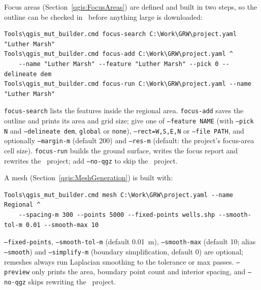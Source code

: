         Focus areas (Section~\ref{qgis:FocusAreas}) are defined and built in two steps, so the outline can be checked in \qgis\ before anything large is downloaded:
\begin{verbatim}
Tools\qgis_mut_builder.cmd focus-search C:\Work\GRW\project.yaml "Luther Marsh"
Tools\qgis_mut_builder.cmd focus-add C:\Work\GRW\project.yaml ^
    --name "Luther Marsh" --feature "Luther Marsh" --pick 0 --delineate dem
Tools\qgis_mut_builder.cmd focus-run C:\Work\GRW\project.yaml --name "Luther Marsh"
\end{verbatim}
        {\tt focus-search} lists the features inside the regional area.  {\tt focus-add} saves the outline and prints its area and grid size; give one of {\tt --feature NAME} (with {\tt --pick N} and {\tt --delineate dem}, {\tt global} or {\tt none}), {\tt --rect=W,S,E,N} or {\tt --file PATH}, and optionally {\tt --margin-m} (default 200) and {\tt --res-m} (default: the project's focus-area cell size).  {\tt focus-run} builds the ground surface, writes the focus report and rewrites the \qgis\ project; add {\tt --no-qgz} to skip the \qgis\ project.

        A mesh (Section~\ref{qgis:MeshGeneration}) is built with:
\begin{verbatim}
Tools\qgis_mut_builder.cmd mesh C:\Work\GRW\project.yaml --name Regional ^
    --spacing-m 300 --points 5000 --fixed-points wells.shp --smooth-tol-m 0.01 --smooth-max 10
\end{verbatim}
        {\tt --fixed-points}, {\tt --smooth-tol-m} (default 0.01~m), {\tt --smooth-max} (default 10; alias {\tt --smooth}) and {\tt --simplify-m} (boundary simplification, default 0) are optional; remeshes always run Laplacian smoothing to the tolerance or max passes.  {\tt --preview} only prints the area, boundary point count and interior spacing, and {\tt --no-qgz} skips rewriting the \qgis\ project.

